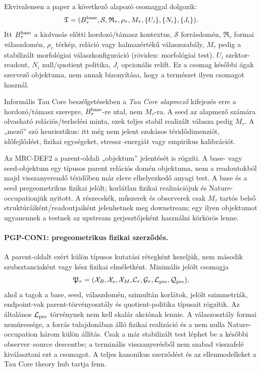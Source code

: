 \documentclass[12pt]{article}
\newcommand{\Ssrc}{\mathcal S}
\newcommand{\RTspace}{\mathfrak R_{\tau}}
\newcommand{\Rmap}{\rho_{\tau}}
\newcommand{\Mta}{M_{\tau}}
\begin{document}
Ekvivalensen a paper a következő alapozó csomaggal dolgozik:
\[
  \mathfrak T
  =
  (B_\tau^{\rm base},\Ssrc,\RTspace,\Rmap,\Mta,
   \{U_i\},\{N_i\},\{J_i\}).
\]
Itt \(B_\tau^{\rm base}\) a kiolvasás előtti hordozó/támasz kontextus,
\(\Ssrc\) forrásdomén, \(\RTspace\) formai válaszdomén, \(\Rmap\) térkép,
reláció vagy halmazértékű válaszszabály, \(\Mta\) pedig a stabilizált
morfológiai válaszkonfiguráció (röviden: morfológiai test). \(U_i\)
szektor-readout, \(N_i\) null/quotient politika, \(J_i\) opcionális
relift.  Ez a csomag későbbi ágak szervező objektuma, nem annak bizonyítása,
hogy a természet ilyen csomagot használ.

Informális Tau Core beszélgetésekben a \emph{Tau Core alapmező} kifejezés erre
a hordozó/támasz szerepre, \(B_\tau^{\rm base}\)-re utal, nem \(\Mta\)-ra.
A seed az alapmező számára olvasható relációs/terhelési minta, ezek teljes
stabil realizált válasza pedig \(\Mta\). A „mező” szó heurisztikus: itt még
nem jelent szokásos téridődimenziót, időfejlődést, fizikai egységeket,
stressz--energiát vagy empirikus kalibrációt.

Az MRC-DEF2 a parent-oldali „objektum” jelentését is rögzíti. A base- vagy
seed-objektum egy típusos parent relációs domén objektuma, nem a readoutokból
majd visszanyerendő téridőben már eleve elhelyezkedő anyagi test. A base és a
seed pregeometrikus fizikai jelölt; korlátlan fizikai realizációjuk és
Nature-occupationjük nyitott. A részecskék, műszerek és observerek csak
\(\Mta\) tartós belső struktúráiként/readoutjaiként jelenhetnek meg downstream;
egy ilyen objektumot ugyanennek a testnek az upstream gerjesztőjeként használni
körkörös lenne.

\paragraph{PGP-CON1: pregeometrikus fizikai szerződés.}
A parent-oldalt ezért külön típusos kutatási rétegként kezeljük, nem második
szubsztanciaként vagy kész fizikai elméletként. Minimális jelölt csomagja
\[
 \mathfrak P_\tau=
 (\mathcal X_B,\mathcal X_s,\mathcal X_M,
  \mathcal C_\tau,\mathcal G_\tau,
  \mathcal L_{\rm pre},\mathcal Q_{\rm pre}),
\]
ahol a tagok a base, seed, válaszdomén, szimultán korlátok, jelölt
szimmetriák, endpoint-vak parent-törvényosztály és quotient-politika típusait
rögzítik. Az általános \(\mathcal L_{\rm pre}\) törvénynek nem kell skalár
akciónak lennie. A válaszosztály formai nemüressége, a forrás tulajdonában álló
fizikai realizáció és a nem nulla Nature-occupation három külön állítás. Csak
a már stabilizált test léphet be a későbbi observer--source descentbe; a
terminális visszanyerésből nem szabad visszafelé kiválasztani ezt a csomagot.
A teljes kanonikus szerződést és az ellenmodelleket a Tau Core theory hub
tartja fenn.
\end{document}
